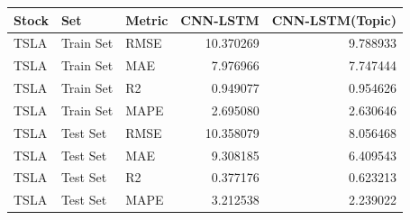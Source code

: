 \begin{tabular}{lllrr}
\toprule
Stock & Set & Metric & CNN-LSTM & CNN-LSTM(Topic) \\
\midrule
TSLA & Train Set & RMSE & 10.370269 & 9.788933 \\
TSLA & Train Set & MAE & 7.976966 & 7.747444 \\
TSLA & Train Set & R2 & 0.949077 & 0.954626 \\
TSLA & Train Set & MAPE & 2.695080 & 2.630646 \\
TSLA & Test Set & RMSE & 10.358079 & 8.056468 \\
TSLA & Test Set & MAE & 9.308185 & 6.409543 \\
TSLA & Test Set & R2 & 0.377176 & 0.623213 \\
TSLA & Test Set & MAPE & 3.212538 & 2.239022 \\
\bottomrule
\end{tabular}
